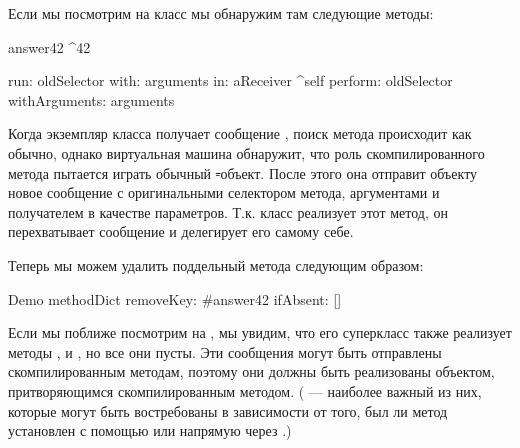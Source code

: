 \documentclass[a4paper,10pt,twoside]{book}
\begin{document}
Если мы посмотрим на класс  мы обнаружим там следующие методы:
\begin{code}{}
answer42
	^42

run: oldSelector with: arguments in: aReceiver
	^self perform: oldSelector withArguments: arguments
\end{code}

Когда экземпляр класса  получает сообщение , поиск метода происходит как обычно, однако виртуальная машина обнаружит, что роль скомпилированного метода пытается играть обычный \st-объект.
После этого она отправит объекту новое сообщение  с оригинальными селектором метода, аргументами и получателем в качестве параметров.
Т.к. класс  реализует этот метод, он перехватывает сообщение и делегирует его самому себе.

Теперь мы можем удалить поддельный метода следующим образом:
\begin{code}{}
Demo methodDict removeKey: #answer42 ifAbsent: []
\end{code}

Если мы поближе посмотрим на , мы увидим, что его суперкласс также реализует методы ,  и , но все они пусты. Эти сообщения могут быть отправлены скомпилированным методам, поэтому они должны быть реализованы объектом, притворяющимся скомпилированным методом. ( --- наиболее важный из них, которые могут быть востребованы в зависимости от того, был ли метод установлен с помощью  или напрямую через .)
\end{document}
